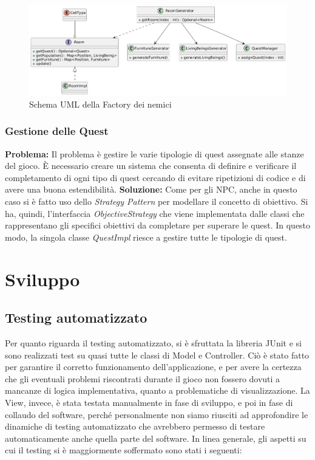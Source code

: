 \documentclass[a4paper,12pt]{report}
\begin{document}
\begin{figure}[H]
	\centering{}
	\includegraphics[width=\textwidth]{img/RoomUML.png}
	\caption{Schema UML della Factory dei nemici}
\end{figure}

\subsection{\textbf{Gestione delle Quest}}
\textbf{Problema:} Il problema è gestire le varie tipologie di quest assegnate alle stanze del gioco. È necessario creare un sistema che consenta di definire 
e verificare il completamento di ogni tipo di quest cercando di evitare ripetizioni di codice e di avere una buona estendibilità.\newline
\textbf{Soluzione:} Come per gli NPC, anche in questo caso si è fatto uso dello \textit{Strategy Pattern} per modellare il concetto di obiettivo.
Si ha, quindi, l'interfaccia \textit{ObjectiveStrategy} che viene implementata dalle classi che rappresentano gli specifici obiettivi da completare per superare le quest.
In questo modo, la singola classe \textit{QuestImpl} riesce a gestire tutte le tipologie di quest.\newline

\chapter{Sviluppo}
\section{Testing automatizzato}

Per quanto riguarda il testing automatizzato, si è sfruttata la libreria JUnit e si sono realizzati test su quasi tutte le classi di Model e Controller. Ciò è stato fatto per garantire il corretto funzionamento dell’applicazione, e per avere la certezza che gli eventuali problemi riscontrati durante il gioco non fossero dovuti a mancanze di logica implementativa, quanto a problematiche di visualizzazione. 
%
\newline La View, invece, è stata testata manualmente in fase di sviluppo, e poi in fase di collaudo del software, perché personalmente non siamo riusciti ad approfondire le dinamiche di testing automatizzato che avrebbero permesso di testare automaticamente anche quella parte del software.
%
\newline In linea generale, gli aspetti su cui il testing si è maggiormente soffermato sono stati i seguenti:
\end{document}
